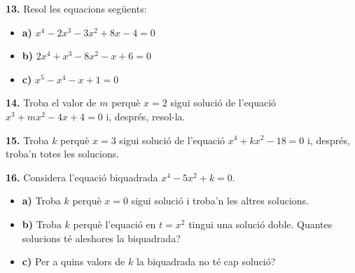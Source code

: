 \documentclass[13pt,a4paper]{extarticle}
\begin{document}
\par\noindent\begin{minipage}{\linewidth}
\textbf{13.} Resol les equacions següents:\par

\begin{itemize}[leftmargin=0pt,itemsep=6pt,topsep=4pt,parsep=0pt,label={}]
\item \textbf{a)} $x^4-2x^3-3x^2+8x-4=0$
\item \textbf{b)} $2x^4+x^3-8x^2-x+6=0$
\item \textbf{c)} $x^5-x^4-x+1=0$
\end{itemize}
\end{minipage}\par\vspace{1.6mm}
\par\noindent\begin{minipage}{\linewidth}
\textbf{14.} Troba el valor de $m$ perquè $x=2$ sigui solució de l'equació $x^3+mx^2-4x+4=0$ i, després, resol-la.\par
\end{minipage}\par\vspace{1.6mm}
\par\noindent\begin{minipage}{\linewidth}
\textbf{15.} Troba $k$ perquè $x=3$ sigui solució de l'equació $x^4+kx^2-18=0$ i, després, troba'n totes les solucions.\par
\end{minipage}\par\vspace{1.6mm}
\par\noindent\begin{minipage}{\linewidth}
\textbf{16.} Considera l'equació biquadrada $x^4-5x^2+k=0$.\par

\begin{itemize}[leftmargin=0pt,itemsep=6pt,topsep=4pt,parsep=0pt,label={}]
\item \textbf{a)} Troba $k$ perquè $x=0$ sigui solució i troba'n les altres solucions.
\item \textbf{b)} Troba $k$ perquè l'equació en $t=x^2$ tingui una solució doble. Quantes solucions té aleshores la biquadrada?
\item \textbf{c)} Per a quins valors de $k$ la biquadrada no té cap solució?
\end{itemize}
\end{minipage}\par\vspace{1.6mm}
\end{document}
